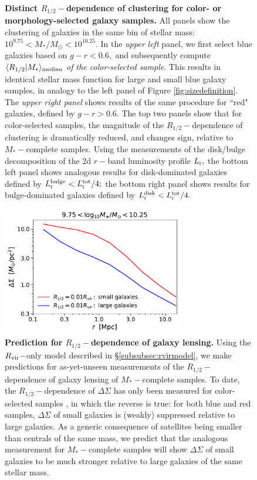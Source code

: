 \documentclass[usenatbib,usegraphicx,letterpaper]{mn2e}
\newcommand{\rhalf}{R_{1/2}}
\newcommand{\mstar}{M_{\ast}}
\newcommand{\rvir}{R_{\rm vir}}
\newcommand{\median}[2]{\langle{#1}\vert{#2}\rangle_{\rm median}}
\newcommand{\msun}{M_\odot}
\begin{document}
\begin{figure}
\caption{
{\bf Distinct $\rhalf-$dependence of clustering for color- or morphology-selected galaxy samples.} 
All panels show the clustering of galaxies in the same bin of stellar mass: $10^{9.75}<\mstar/\msun<10^{10.25}.$ In the {\em upper left} panel, we first select blue galaxies based on $g-r<0.6,$ and subsequently compute $\median{\rhalf}{\mstar}$ {\em of the color-selected sample}. This results in identical stellar mass function for large and small blue galaxy samples, in analogy to the left panel of Figure \ref{fig:sizedefinition}. The {\em upper right panel} shows results of the same procedure for ``red" galaxies, defined by $g-r>0.6.$ The top two panels show that for color-selected samples, the magnitude of the $\rhalf-$dependence of clustering is dramatically reduced, and changes sign, relative to $\mstar-$complete samples. Using the \citet{meert_etal15} measurements of the disk/bulge decomposition of the 2d $r-$band luminosity profile $L_{\rm r},$ the bottom left panel shows analogous results for disk-dominated galaxies defined by $L_{\rm r}^{\rm bulge}<L_{\rm r}^{\rm tot}/4;$ the bottom right panel shows results for bulge-dominated galaxies defined by $L_{\rm r}^{\rm disk}<L_{\rm r}^{\rm tot}/4.$
}
\label{fig:strippingorphans}
\end{figure}

\begin{figure}
\centering
\includegraphics[width=8cm]{FIGS/rvir_only_lensing_prediction.pdf}
\caption{
{\bf Prediction for $\rhalf-$dependence of galaxy lensing.} 
Using the $\rvir-$only model described in \S\ref{subsubsec:rvirmodel}, we make predictions for as-yet-unseen measurements of the $\rhalf-$dependence of galaxy lensing of $\mstar-$complete samples. To date, the $\rhalf-$dependence of $\Delta\Sigma$ has only been measured for color-selected samples \citep{charlton_etal17}, in which the reverse is true: for both blue and red samples, $\Delta\Sigma$ of small galaxies is (weakly) suppressed relative to large galaxies. As a generic consequence of satellites being smaller than centrals of the same mass, we predict that the analogous measurement for $\mstar-$complete samples will show $\Delta\Sigma$ of small galaxies to be much stronger relative to large galaxies of the same stellar mass. 
}
\label{fig:strippingorphans}
\end{figure}
\end{document}

